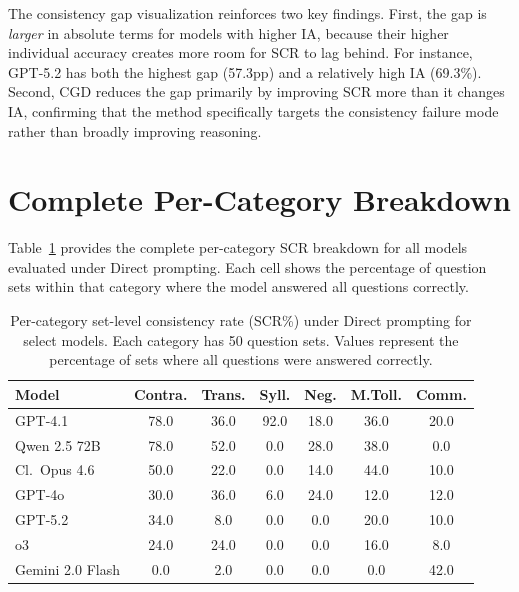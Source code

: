 \documentclass{article}
\newcommand{\method}{\textsc{CGD}}
\begin{document}
The consistency gap visualization reinforces two key findings. First, the gap is \emph{larger} in absolute terms for models with higher IA, because their higher individual accuracy creates more room for SCR to lag behind. For instance, GPT-5.2 has both the highest gap (57.3pp) and a relatively high IA (69.3\%). Second, \method{} reduces the gap primarily by improving SCR more than it changes IA, confirming that the method specifically targets the consistency failure mode rather than broadly improving reasoning.

\section{Complete Per-Category Breakdown}
\label{app:fullcategory}

Table~\ref{tab:percategory} provides the complete per-category SCR breakdown for all models evaluated under Direct prompting. Each cell shows the percentage of question sets within that category where the model answered all questions correctly.

\begin{table}[ht]
\caption{Per-category set-level consistency rate (SCR\%) under Direct prompting for select models. Each category has 50 question sets. Values represent the percentage of sets where all questions were answered correctly.}
\label{tab:percategory}
\begin{center}
\small
\setlength{\tabcolsep}{4pt}
\begin{tabular}{l cccccc}
\toprule
\textbf{Model} & \textbf{Contra.} & \textbf{Trans.} & \textbf{Syll.} & \textbf{Neg.} & \textbf{M.Toll.} & \textbf{Comm.} \\
\midrule
GPT-4.1 & 78.0 & 36.0 & 92.0 & 18.0 & 36.0 & 20.0 \\
Qwen 2.5 72B & 78.0 & 52.0 & 0.0 & 28.0 & 38.0 & 0.0 \\
Cl.\ Opus 4.6 & 50.0 & 22.0 & 0.0 & 14.0 & 44.0 & 10.0 \\
GPT-4o & 30.0 & 36.0 & 6.0 & 24.0 & 12.0 & 12.0 \\
GPT-5.2 & 34.0 & 8.0 & 0.0 & 0.0 & 20.0 & 10.0 \\
o3 & 24.0 & 24.0 & 0.0 & 0.0 & 16.0 & 8.0 \\
Gemini 2.0 Flash & 0.0 & 2.0 & 0.0 & 0.0 & 0.0 & 42.0 \\
\bottomrule
\end{tabular}
\end{center}
\end{table}
\end{document}
